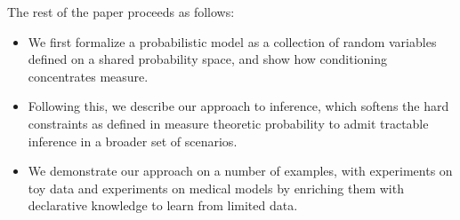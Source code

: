 The rest of the paper proceeds as follows:
\begin{itemize}
\item We first formalize a probabilistic model as a collection of random variables defined on a shared probability space, and show how conditioning concentrates measure.
\item Following this, we describe our approach to inference, which softens the hard constraints as defined in measure theoretic probability to admit tractable inference in a broader set of scenarios.
\item  We demonstrate our approach on a number of examples, with experiments on toy data and experiments on medical models by enriching them with declarative knowledge to learn from limited data.
\end{itemize}